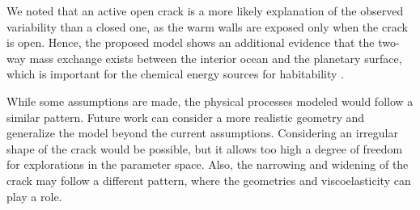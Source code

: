 \documentclass[draft]{agujournal2019}
\begin{document}
\begin{refsection}
We noted that an active open crack is a more likely explanation of the observed variability than a closed one, as the warm walls are exposed only when the crack is open. Hence, the proposed model shows an additional evidence that the two-way mass exchange exists between the interior ocean and the planetary surface, which is important for the chemical energy sources for habitability \cite{parkinson2008habitability}.

While some assumptions are made, the physical processes modeled would follow a similar pattern. Future work can consider a more realistic geometry and generalize the model beyond the current assumptions. Considering an irregular shape of the crack would be possible, but it allows too high a degree of freedom for explorations in the parameter space. Also, the narrowing and widening of the crack may follow a different pattern, where the geometries and viscoelasticity can play a role. 






%
%

%
%
%
%
%
%
%
%


\end{refsection}
\end{document}
